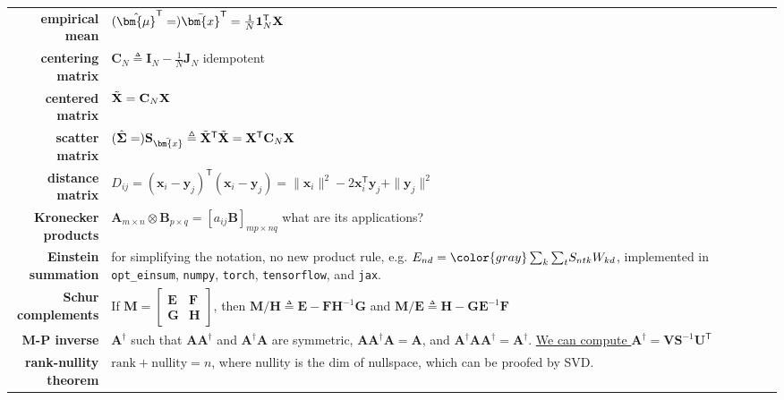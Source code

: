 \begin{table}[htpb]
\begin{tabular}{rp{24em}}
        \textbf{empirical mean}                         & $(\hat{\bm{\mu}}^\mathsf{T}=)\Bar{\bm{x}}^\mathsf{T}=\frac{1}{N}\mathbf{1}_N^\mathsf{T}\mathbf{X}$ \\
        \textbf{centering matrix}                       & $\mathbf{C}_N\triangleq\mathbf{I}_N-\frac{1}{N}\mathbf{J}_N$ idempotent\\
        \textbf{centered matrix}                        & $\Tilde{\mathbf{X}}=\mathbf{C}_N\mathbf{X}$ \\
        \textbf{scatter matrix}                         & 
        $(\hat{\mathbf{\Sigma}}=)\mathbf{S}_{\Bar{\bm{x}}}\triangleq\Tilde{\mathbf{X}}^\mathsf{T}\Tilde{\mathbf{X}}=\mathbf{X}^\mathsf{T}\mathbf{C}_N\mathbf{X}$ \\
        
        \textbf{distance matrix}                        & 
        $D_{ij}=(\bm{x}_i-\bm{y}_j)^\mathsf{T}(\bm{x}_i-\bm{y}_j)=\|\bm{x}_i\|^2-2\bm{x}_i^\mathsf{T}\bm{y}_j+\|\bm{y}_j\|^2$ \\
        \textbf{Kronecker products}                     & $\mathbf{A}_{m\times n}\otimes\mathbf{B}_{p\times q}=[a_{ij}\mathbf{B}]_{mp\times nq}$ {\color{red} what are its applications?} \\
        \textbf{Einstein summation}                     & for simplifying the notation, no new product rule, e.g. $E_{nd}={\color{gray}\sum_k\sum_t}S_{ntk}W_{kd}$,
        implemented in \texttt{opt\_einsum}, \texttt{numpy}, \texttt{torch}, \texttt{tensorflow}, and \texttt{jax}. \\
        \textbf{Schur complements}                      & If $\mathbf{M}=\left[\begin{array}{cc}
            \mathbf{E} & \mathbf{F} \\
            \mathbf{G} & \mathbf{H}
        \end{array}\right]$, then $\mathbf{M}/\mathbf{H}\triangleq\mathbf{E}-\mathbf{FH}^{-1}\mathbf{G}$ and $\mathbf{M}/\mathbf{E}\triangleq\mathbf{H}-\mathbf{GE}^{-1}\mathbf{F}$\\
        \textbf{M-P inverse}                            & $\mathbf{A}^\dag$ such that $\mathbf{AA}^\dag$ and $\mathbf{A}^\dag\mathbf{A}$ are symmetric,
        $\mathbf{AA}^\dag\mathbf{A}=\mathbf{A}$, and $\mathbf{A}^\dag\mathbf{AA}^\dag=\mathbf{A}^\dag$. 
        \uline{We can compute $\mathbf{A}^\dag=\mathbf{VS}^{-1}\mathbf{U}^\mathsf{T}$} \\
        \textbf{rank-nullity theorem}                   & $\text{rank} + \text{nullity} = n$, where nullity is the dim of nullspace, which can be proofed by SVD.\\

\end{tabular}
\end{table}
